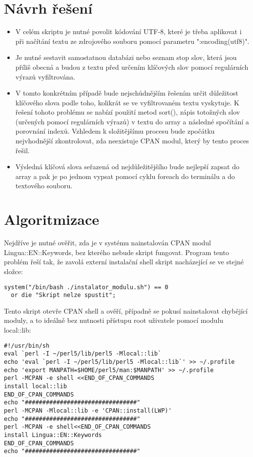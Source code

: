 \documentclass[a4paper,11pt]{article}
\theoremstyle{mytheor}
\begin{document}
\section*{Návrh řešení}

\begin{itemize}
\item V celém skriptu je nutné povolit kódování UTF-8, které je
třeba aplikovat i při načítání textu ze zdrojového souboru pomocí
parametru ":encoding(utf8)".
\item Je nutné sestavit samostatnou databázi nebo seznam stop slov,
která jsou příliš obecná a budou z textu před určením klíčových slov
pomocí regulárních výrazů vyfiltrována. 
\item V tomto konkrétním případě bude nejschůdnějším řešením určit
důležitost klíčového slova podle toho, kolikrát se ve vyfiltrovaném
textu vyskytuje. K řešení tohoto problému se nabízí použití metod
sort(), zápis totožných slov (určených pomocí regulárních výrazů) v
textu
do array a následné spočítání a 
porovnání indexů. Vzhledem k složitějšímu procesu bude zpočátku 
nejvhodnější zkontrolovat, zda neexistuje CPAN modul, který by tento
proces řešil.
\item Výsledná klíčová slova seřazená od nejdůležitějšího bude
nejlepší zapsat do array a pak je po jednom vypsat pomocí cyklu
foreach do terminálu a do textového souboru.
\end{itemize}


\section*{Algoritmizace}

Nejdříve je nutné ověřit, zda je v systému nainstalován CPAN modul
Lingua::EN::Keywords, bez kterého nebude skript fungovat. Program 
tento problém řeší tak, že zavolá externí instalační shell skript 
nacházející se ve stejné složce:

\begin{lstlisting}[label={list:first},caption=Příkaz pro spuštění
instalačního
skriptu --
Analyzátor klíčových slov.]
system("/bin/bash ./instalator_modulu.sh") == 0
  or die "Skript nelze spustit";
\end{lstlisting}

Tento skript otevře CPAN shell a ověří, případně se pokusí
nainstalovat chybějící moduly, a to ideálně bez nutnosti přístupu
root uživatele pomocí modulu local::lib:

\begin{lstlisting}[label={list:first},caption=Instalační skript instalator\_modulu.sh -- Analyzátor klíčových slov.]
#!/usr/bin/sh
eval `perl -I ~/perl5/lib/perl5 -Mlocal::lib`
echo 'eval `perl -I ~/perl5/lib/perl5 -Mlocal::lib`' >> ~/.profile
echo 'export MANPATH=$HOME/perl5/man:$MANPATH' >> ~/.profile
perl -MCPAN -e shell <<END_OF_CPAN_COMMANDS
install local::lib
END_OF_CPAN_COMMANDS
echo "################################"
perl -MCPAN -Mlocal::lib -e 'CPAN::install(LWP)'
echo "################################"
perl -MCPAN -e shell<<END_OF_CPAN_COMMANDS
install Lingua::EN::Keywords
END_OF_CPAN_COMMANDS
echo "################################"
\end{lstlisting}
\end{document}
